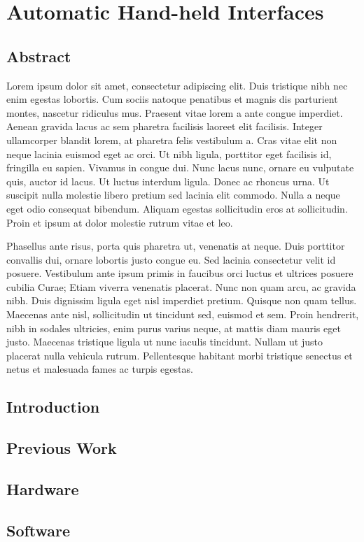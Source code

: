 \documentclass[12pt]{report}	%
\begin{document}
\chapter{Automatic Hand-held Interfaces}
	\section{Abstract}
	Lorem ipsum dolor sit amet, consectetur adipiscing elit. Duis tristique nibh nec enim egestas lobortis. Cum sociis natoque penatibus et magnis dis parturient montes, nascetur ridiculus mus. Praesent vitae lorem a ante congue imperdiet. Aenean gravida lacus ac sem pharetra facilisis laoreet elit facilisis. Integer ullamcorper blandit lorem, at pharetra felis vestibulum a. Cras vitae elit non neque lacinia euismod eget ac orci. Ut nibh ligula, porttitor eget facilisis id, fringilla eu sapien. Vivamus in congue dui. Nunc lacus nunc, ornare eu vulputate quis, auctor id lacus. Ut luctus interdum ligula. Donec ac rhoncus urna. Ut suscipit nulla molestie libero pretium sed lacinia elit commodo. Nulla a neque eget odio consequat bibendum. Aliquam egestas sollicitudin eros at sollicitudin. Proin et ipsum at dolor molestie rutrum vitae et leo.

  Phasellus ante risus, porta quis pharetra ut, venenatis at neque. Duis porttitor convallis dui, ornare lobortis justo congue eu. Sed lacinia consectetur velit id posuere. Vestibulum ante ipsum primis in faucibus orci luctus et ultrices posuere cubilia Curae; Etiam viverra venenatis placerat. Nunc non quam arcu, ac gravida nibh. Duis dignissim ligula eget nisl imperdiet pretium. Quisque non quam tellus. Maecenas ante nisl, sollicitudin ut tincidunt sed, euismod et sem. Proin hendrerit, nibh in sodales ultricies, enim purus varius neque, at mattis diam mauris eget justo. Maecenas tristique ligula ut nunc iaculis tincidunt. Nullam ut justo placerat nulla vehicula rutrum. Pellentesque habitant morbi tristique senectus et netus et malesuada fames ac turpis egestas.
	\section{Introduction}
	\section{Previous Work}
	\section{Hardware}
	\section{Software}
\end{document}
